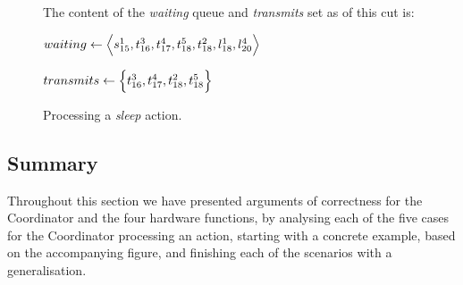 \begin{figure}[H]
    \caption{Processing a \textit{sleep} action.}\label{tikz:coordinatormsc5}
     \par

    \begin{minipage}[h]{14.5cm}
        The content of the \textit{waiting} queue and \textit{transmits} set as of this cut is: \smallbreak

        $waiting \leftarrow \Big\langle s^{1}_{15}, t^{3}_{16}, t^{4}_{17}, t^{5}_{18}, t^{2}_{18}, l^{1}_{18},
            l^{4}_{20} \Big\rangle$

        $transmits \leftarrow \Big\{ t^{3}_{16}, t^{4}_{17}, t^{2}_{18}, t^{5}_{18} \Big\}$
    \end{minipage}
\end{figure}

\subsection{Summary}\label{sec:summary}
Throughout this section we have presented arguments of correctness for the Coordinator and the four hardware
functions, by analysing each of the five cases for the Coordinator processing an action, starting with a
concrete example, based on the accompanying figure, and finishing each of the scenarios with a generalisation.
